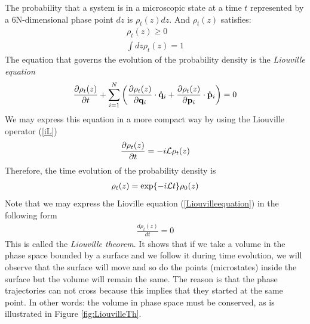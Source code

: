 \documentclass[b5paper,openright,10pt]{book}
\begin{document}
The probability that a system is in a microscopic state at a time $t$ represented by a 6N-dimensional phase point $dz$ is $\rho_t(z)dz$. And $\rho_t(z)$ satisfies:
%
\begin{align}
    \rho_t(z) \geq 0  \nonumber \\
    \int dz\rho_t(z) = 1
\end{align}
%
The equation that governs the evolution of the probability density is the {\it Liouville equation}
\begin{align}
    \frac{\partial\rho_t(z)}{\partial t} + \sum_{i=1}^N\left(\frac{\partial\rho_t(z)}{\partial{\bf q}_i}\cdot{\bf \dot{q}}_i+\frac{\partial\rho_t(z)}{\partial{\bf p}_i}\cdot{\bf \dot{p}}_i\right) = 0
\end{align}
We may express this equation in a more compact way by using the Liouville operator (\ref{iL}) 
\begin{align}
    \frac{\partial\rho_t(z)}{\partial t} = -i{\cal L}\rho_t(z)
    \label{LiouvilleEq}
  \end{align}
Therefore, the time evolution of the probability density is
\begin{align}
    \rho_t(z) = {\rm exp}\{-i{\cal L}t\}\rho_0(z)
    \label{rhot}
\end{align}
Note that we may express the Lioville equation (\ref{Liouvilleequation}) in the following form
\begin{align}
    \frac{d\rho_t(z)}{dt} = 0 
    \label{LiouvilleTh}
\end{align}
This is called the {\it Liouville theorem}. It shows that if we take a volume in the phase space bounded by a surface and we follow it during time evolution, we will observe that the surface will move and so do the points (microstates) inside the surface but the volume will remain the same. The reason is that the phase trajectories can not cross because this implies that they started at the same point. In other words: the volume in phase space must be conserved, as is illustrated in Figure \ref{fig:LiouvilleTh}.
\end{document}
